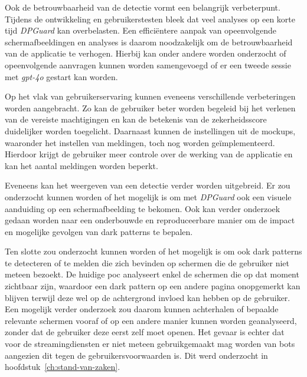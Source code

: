 \vspace{1em}

Ook de betrouwbaarheid van de detectie vormt een belangrijk verbeterpunt. Tijdens de ontwikkeling en gebruikerstesten bleek dat veel analyses op een korte tijd \textit{DPGuard} kan overbelasten. Een efficiëntere aanpak van opeenvolgende schermafbeeldingen en analyses is daarom noodzakelijk om de betrouwbaarheid van de applicatie te verhogen. Hierbij kan onder andere worden onderzocht of opeenvolgende aanvragen kunnen worden samengevoegd of er een tweede sessie met \textit{gpt-4o} gestart kan worden.

\vspace{1em}

Op het vlak van gebruikerservaring kunnen eveneens verschillende verbeteringen worden aangebracht. Zo kan de gebruiker beter worden begeleid bij het verlenen van de vereiste machtigingen en kan de betekenis van de zekerheidsscore duidelijker worden toegelicht. Daarnaast kunnen de instellingen uit de mockups, waaronder het instellen van meldingen, toch nog worden geïmplementeerd. Hierdoor krijgt de gebruiker meer controle over de werking van de applicatie en kan het aantal meldingen worden beperkt.

\vspace{1em}

Eveneens kan het weergeven van een detectie verder worden uitgebreid. Er zou onderzocht kunnen worden of het mogelijk is om met \textit{DPGuard} ook een visuele aanduiding op een schermafbeelding te bekomen. Ook kan verder onderzoek gedaan worden naar een onderbouwde en reproduceerbare manier om de impact en mogelijke gevolgen van dark patterns te bepalen.

\vspace{1em}

Ten slotte zou onderzocht kunnen worden of het mogelijk is om ook dark patterns te detecteren of te melden die zich bevinden op schermen die de gebruiker niet meteen bezoekt. De huidige \acrshort{poc} analyseert enkel de schermen die op dat moment zichtbaar zijn, waardoor een dark pattern op een andere pagina onopgemerkt kan blijven terwijl deze wel op de achtergrond invloed kan hebben op de gebruiker. Een mogelijk verder onderzoek zou daarom kunnen achterhalen of bepaalde relevante schermen vooraf of op een andere manier kunnen worden geanalyseerd, zonder dat de gebruiker deze eerst zelf moet openen. Het gevaar is echter dat voor de streamingdiensten er niet meteen gebruikgemaakt mag worden van bots aangezien dit tegen de gebruikersvoorwaarden is. Dit werd onderzocht in hoofdstuk~\ref{ch:stand-van-zaken}.